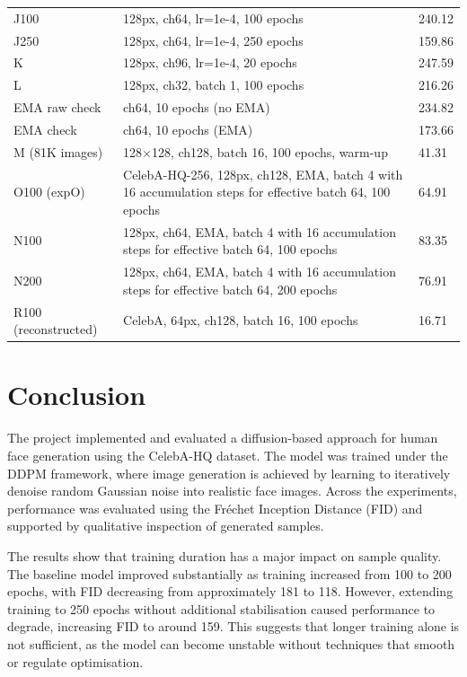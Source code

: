 \documentclass[conference]{IEEEtran}
\begin{document}
\begin{table}[t]
\begin{tabular}{lll}
J100 & 128px, ch64, lr=1e-4, 100 epochs & 240.12 \\
J250 & 128px, ch64, lr=1e-4, 250 epochs & 159.86 \\
K & 128px, ch96, lr=1e-4, 20 epochs & 247.59 \\
L & 128px, ch32, batch 1, 100 epochs & 216.26 \\
EMA raw check & ch64, 10 epochs (no EMA) & 234.82 \\
EMA check & ch64, 10 epochs (EMA) & 173.66 \\
M (81K images) & 128$\times$128, ch128, batch 16, 100 epochs, warm-up & 41.31 \\
O100 (expO) & CelebA-HQ-256, 128px, ch128, EMA, batch 4 with 16 accumulation steps for effective batch 64, 100 epochs & 64.91 \\
N100 & 128px, ch64, EMA, batch 4 with 16 accumulation steps for effective batch 64, 100 epochs  & 83.35 \\
N200 & 128px, ch64, EMA, batch 4 with 16 accumulation steps for effective batch 64, 200 epochs & 76.91 \\
R100 (reconstructed) & CelebA, 64px, ch128, batch 16, 100 epochs & 16.71 \\

\hline
\end{tabular}
\label{tab:results}
\end{table}







\section*{Conclusion}

The project implemented and evaluated a diffusion-based approach for human face generation using the CelebA-HQ dataset. The model was trained under the DDPM framework, where image generation is achieved by learning to iteratively denoise random Gaussian noise into realistic face images. Across the experiments, performance was evaluated using the Fréchet Inception Distance (FID) and supported by qualitative inspection of generated samples.

The results show that training duration has a major impact on sample quality. The baseline model improved substantially as training increased from 100 to 200 epochs, with FID decreasing from approximately 181 to 118. However, extending training to 250 epochs without additional stabilisation caused performance to degrade, increasing FID to around 159. This suggests that longer training alone is not sufficient, as the model can become unstable without techniques that smooth or regulate optimisation.
\end{document}
